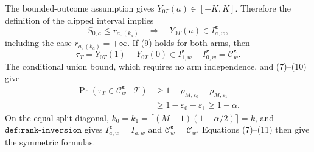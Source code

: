 The bounded-outcome assumption gives \(Y_{0T}(a)\in[-K,K]\). Therefore the definition of the clipped interval implies
\[
S_{0,a}\le r_{a,(k_a)}
\quad\Longrightarrow\quad
Y_{0T}(a)\in I^{\boldsymbol\varepsilon}_{a,w},
\tag{9}
\]
including the case \(r_{a,(k_a)}=+\infty\). If (9) holds for both arms, then
\[
\tau_T=Y_{0T}(1)-Y_{0T}(0)\in I^{\boldsymbol\varepsilon}_{1,w}-I^{\boldsymbol\varepsilon}_{0,w}=\mathcal C^{\boldsymbol\varepsilon}_w.
\tag{10}
\]
The conditional union bound, which requires no arm independence, and (7)--(10) give
\[
\begin{aligned}
\Pr\!\left(\tau_T\in\mathcal C^{\boldsymbol\varepsilon}_w\mid\mathcal T\right)
&\ge1-\rho_{M,\varepsilon_0}-\rho_{M,\varepsilon_1}\\
&\ge1-\varepsilon_0-\varepsilon_1\ge1-\alpha.
\end{aligned}
\tag{11}
\]
On the equal-split diagonal, \(k_0=k_1=\lceil(M+1)(1-\alpha/2)\rceil=k\), and \(\texttt{def:rank-inversion}\) gives \(I^{\boldsymbol\varepsilon}_{a,w}=I_{a,w}\) and \(\mathcal C^{\boldsymbol\varepsilon}_w=\mathcal C_w\). Equations (7)--(11) then give the symmetric formulas.